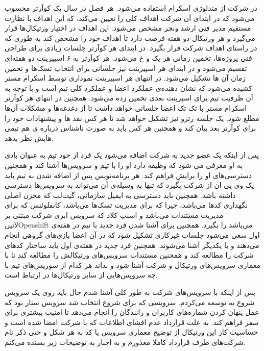 \documentclass[a4]{report}
\begin{document}
در شرکت از متدلوژی اسکرام استفاده می‌شود.
هر فصل در سال یک کوآرتر محسوب می‌شود که در ابتدای آن شرکت اهداف کلی را تعیین می‌کند،
که این اهداف با نظارت مستقیم مدیر فنی ارشد ونچر مشخص می‌شود.
این اهداف در اختیار ورتیکال‌ها قرار می‌گیرد و هر ورتیکال دو هفته فرصت دارد تا اهداف خود را مشخص کند به طوری که در راستای اهداف شرکت قرار بگیرد.
در ابتدای هر کوآرتر جلسات زیادی برای طراحی فنی پروژه‌ها، تخمین زمانی هر یک و ‌خ می‌شود.
هر کوآرتر به ۶ اسپیرینت دو هفته‌ای تقسیم می‌شود و در ابتدای هر اسپیرینت نیز جلساتی برای انتخاب تسک‌ها و تخمین زمان آن ها تشکیل می‌شود.
در انتهای هر اسپیرینت نموداری توسط اسکرام مستر کشیده می‌شود که نشان دهنده‌ی عملکرد اعضا و عملکرد کلی تیم است
و با توجه به آن ظرفیت تیم برای اسپرینت بعدی تخمین زده می‌شود.
همچنین در انتهای هر کوآرتر اسکرام مستر با تک تک اعضا جلساتی خواهد داشت تا از دغدغه‌ها و مشکلات آن‌ها مطلع شود.
یک جلسه رترو نیز تشکیل خواهد شد تا هر کس نقد ها و پیشنهادات خود را برای کوآرتر بعد بیان کند و
همچنین هر کس باید به صورت ناشناس درباره ی هم تیمی هایش نظر بدهد.

پس از اینکه یک عضو جدید به شرکت اضافه می‌شود یک فرد از خود تیم به عنوان بادی به او معرفی می شود
که وظیفه دارد او را با تیم و سرویس‌ها آشنا کند و همچنین دسترسی‌های او را برایش فراهم کند.
هر برنامه‌نویس پس از اضافه شدن به تیم باید یک وی پی ان از شرکت بگیرد که تنها به وسیله‌ی آن می‌تواند به سرویس‌ها دسترسی داشته باشد.
همچنین باید دسترسی به ایمیل سازمانی، گیت‌لب که مخزن اصلی نگهداری کدها می‌باشد،
جیرا که برای مدیریت تسک‌ها می‌باشد،
کانفلوئنس که برای مدیریت مستندات می‌باشد
و اسنپ کلاد که سرویس ابری شرکت مبتنی بر ‌لاتین{Openshift} می‌باشد
را بگیرد.
همچنین برای آشنا شدن فرد جدید با تیم در هفته‌ی اول سعی می‌شود جلسات غیرکاری تشکیل شود که در آن اعضا بازی‌های گروهی انجام می‌دهند
و با یکدیگر آشنا می‌شوند.
همچنین فرد جدید در هفته‌ی اول باید ساختار کد‌های شرکت را مطالعه کند
و همچنین مستندات سرویس‌های ورتیکالش را مطالعه کند
تا با معماری سرویس‌های ورتیکال و شرکت آشنا شود
و بداند هر کدام از سوریس‌های تیم با چه سرویس‌هایی از سایر ورتیکال‌ها در ارتباط است.


پس از اینکه با سرویس‌های شرکت به طور کلی آشنا شدم حال باید روی یک سرویس شروع به توسعه می‌کردم.
سرویسی که برای شروع انتخاب شد سرویس ستار بود که عمل پنهان کردن شماره‌های کاربران و رانندگان را انجام می‌دهد تا امنیت بیشتری برای سفر فراهم کند.
به علت قرارداد عدم افشای اطلاعات که با شرکت امضا شده است و حساسیت کار این ورتیکال از توضیح معماری سرویس یا کد به هر شکل و حتی ذکر نام شرکت‌های
طرف قرارداد کاملا معذورم و به اجبار به توضیحات زیر بسنده می‌کنم.
\end{document}
